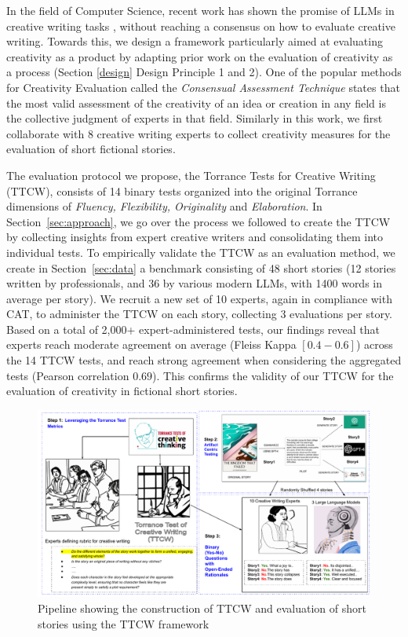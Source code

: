 In the field of Computer Science, recent work has shown the promise of LLMs in creative writing tasks \cite{mirowski2023cowriting,yang2022re3,lee2022coauthor}, without reaching a consensus on how to evaluate creative writing. Towards this, we design a framework particularly aimed at evaluating creativity as a product by adapting prior work on the evaluation of creativity as a process (Section \ref{design} Design Principle 1 and 2). One of the popular methods for Creativity Evaluation called the \textit{Consensual Assessment Technique} \cite{amabile1982social} states that the most valid assessment of the creativity of an idea or creation in any field is the collective judgment of experts in that field. Similarly in this work, we first collaborate with 8 creative writing experts to collect creativity measures for the evaluation of short fictional stories. 

The evaluation protocol we propose, the Torrance Tests for Creative Writing (TTCW), consists of 14 binary tests organized into the original Torrance dimensions of \textit{Fluency, Flexibility, Originality} and \textit{Elaboration}. In Section~\ref{sec:approach}, we go over the process we followed to create the TTCW by collecting insights from expert creative writers and consolidating them into individual tests. To empirically validate the TTCW as an evaluation method, we create in Section~\ref{sec:data} a benchmark consisting of 48 short stories (12 stories written by professionals, and 36 by various modern LLMs, with 1400 words in average per story). We recruit a new set of 10 experts, again in compliance with CAT, to administer the TTCW on each story, collecting 3 evaluations per story. Based on a total of 2,000+ expert-administered tests, our findings reveal that experts reach moderate agreement on average (Fleiss Kappa $[0.4-0.6]$) across the 14 TTCW tests, and reach strong agreement when considering the aggregated tests (Pearson correlation $0.69$). This confirms the validity of our TTCW for the evaluation of creativity in fictional short stories.

\begin{figure}
\centering
\includegraphics[width=\textwidth]{figures/CHI_pipeline.pdf}
\caption{\label{pipeline}Pipeline showing the construction of TTCW and evaluation of short stories using the TTCW framework}
\end{figure}

